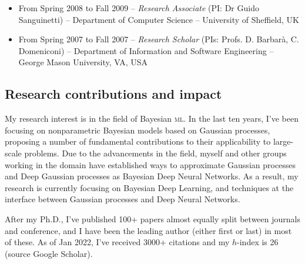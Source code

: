 \documentclass[a4paper,10pt]{article}
\newcommand{\ml}{\name{ml}}
\newcommand{\name}[1]{{\textsc{#1}}\xspace}
\begin{document}
\begin{itemize}
\item From Spring 2008 to Fall 2009 -- {\em Research Associate} (PI: Dr Guido Sanguinetti) -- %
  Department of Computer Science -- University of Sheffield, UK %

\item From Spring 2007 to Fall 2007 -- {\em Research Scholar} (PIs: Profs. D. Barbar\`a, C. Domeniconi) -- %
  Department of Information and Software Engineering -- George Mason University, VA, USA %
  
\end{itemize}



	
	
\subsection*{Research contributions and impact}

My research interest is in the field of Bayesian \ml. 
In the last ten years, I've been focusing on nonparametric Bayesian models based on Gaussian processes, proposing a number of fundamental contributions to their applicability to large-scale problems.
Due to the advancements in the field, myself and other groups working in the domain have established ways to approximate Gaussian processes and Deep Gaussian processes as Bayesian Deep Neural Networks. 
As a result, my research is currently focusing on Bayesian Deep Learning, and techniques at the interface between Gaussian processes and Deep Neural Networks. 

After my Ph.D., I've published 100+ papers almost equally split between journals and conference, and I have been the leading author (either first or last) in most of these.
As of Jan 2022, I've received 3000+ citations and my $h$-index is 26 (source Google Scholar).
\end{document}
